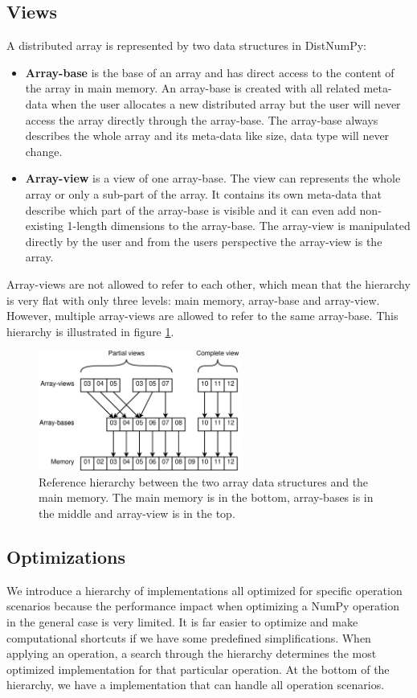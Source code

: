 \documentclass[10pt]{article}
\begin{document}
\subsection{Views}
A distributed array is represented by two data structures in DistNumPy:
\begin{itemize}
\item \textbf{Array-base} is the base of an array and has direct access to the content of the array in main memory. An array-base is created with all related meta-data when the user allocates a new distributed array but the user will never access the array directly through the array-base. The array-base always describes the whole array and its meta-data like size, data type will never change.
\item \textbf{Array-view} is a view of one array-base. The view can represents the whole array or only a sub-part of the array. It contains its own meta-data that describe which part of the array-base is visible and it can even add non-existing 1-length dimensions to the array-base. The array-view is manipulated directly by the user and from the users perspective the array-view is the array.
\end{itemize}
Array-views are not allowed to refer to each other, which mean that the hierarchy is very flat with only three levels: main memory, array-base and array-view. However, multiple array-views are allowed to refer to the same array-base. This hierarchy is illustrated in figure \ref{fig:views}. 

\begin{figure}
 \centering
 \includegraphics[width=250px]{gfx/views}
 \caption{Reference hierarchy between the two array data structures and the main memory. The main memory is in the bottom, array-bases is in the middle and array-view is in the top.}
 \label{fig:views}
\end{figure}

\subsection{Optimizations}
We introduce a hierarchy of implementations all optimized for specific operation scenarios because the performance impact when optimizing a NumPy operation in the general case is very limited. It is far easier to optimize and make computational shortcuts if we have some predefined simplifications. When applying an operation, a search through the hierarchy determines the most optimized implementation for that particular operation. At the bottom of the hierarchy, we have a implementation that can handle all operation scenarios.
\end{document}
